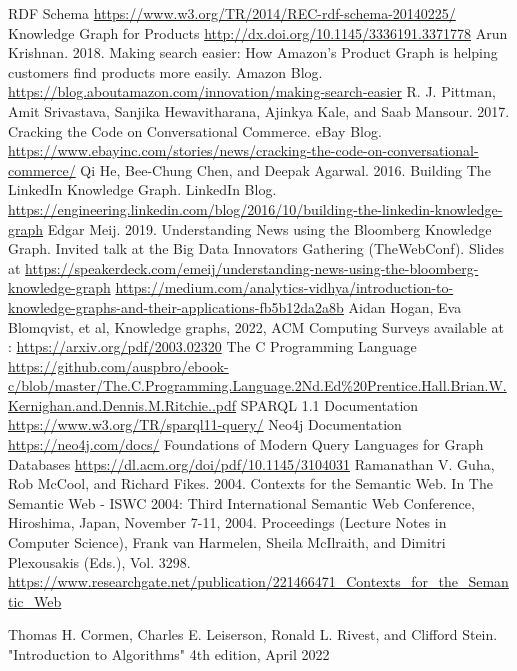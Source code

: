 \documentclass[conference]{IEEEtran}
\begin{document}
\begin{thebibliography}{00}
 RDF Schema \url{https://www.w3.org/TR/2014/REC-rdf-schema-20140225/}
 Knowledge Graph for Products \url{http://dx.doi.org/10.1145/3336191.3371778}
 Arun Krishnan. 2018. Making search easier: How Amazon’s Product Graph is helping customers find products more easily. Amazon Blog. \url{https://blog.aboutamazon.com/innovation/making-search-easier}
 R. J. Pittman, Amit Srivastava, Sanjika Hewavitharana, Ajinkya Kale, and Saab Mansour. 2017. Cracking the Code on Conversational Commerce. eBay Blog. \url{https://www.ebayinc.com/stories/news/cracking-the-code-on-conversational-commerce/}
 Qi He, Bee-Chung Chen, and Deepak Agarwal. 2016. Building The LinkedIn Knowledge Graph. LinkedIn Blog. \url{https://engineering.linkedin.com/blog/2016/10/building-the-linkedin-knowledge-graph}
 Edgar Meij. 2019. Understanding News using the Bloomberg Knowledge Graph. Invited talk at the Big Data Innovators Gathering (TheWebConf). Slides at \url{https://speakerdeck.com/emeij/understanding-news-using-the-bloomberg-knowledge-graph}
 \url{https://medium.com/analytics-vidhya/introduction-to-knowledge-graphs-and-their-applications-fb5b12da2a8b}
 Aidan Hogan, Eva Blomqvist, et al, Knowledge graphs, 2022, ACM Computing Surveys available at : \url{https://arxiv.org/pdf/2003.02320}
 The C Programming Language \url{https://github.com/auspbro/ebook-c/blob/master/The.C.Programming.Language.2Nd.Ed%20Prentice.Hall.Brian.W.Kernighan.and.Dennis.M.Ritchie..pdf}
 SPARQL 1.1 Documentation \url{https://www.w3.org/TR/sparql11-query/}
 Neo4j Documentation 
\url{https://neo4j.com/docs/}
 Foundations of Modern Query Languages for Graph
Databases \url{https://dl.acm.org/doi/pdf/10.1145/3104031}
 Ramanathan V. Guha, Rob McCool, and Richard Fikes. 2004. Contexts for the Semantic Web. In The Semantic Web -
ISWC 2004: Third International Semantic Web Conference, Hiroshima, Japan, November 7-11, 2004. Proceedings (Lecture
Notes in Computer Science), Frank van Harmelen, Sheila McIlraith, and Dimitri Plexousakis (Eds.), Vol. 3298. \url{https://www.researchgate.net/publication/221466471_Contexts_for_the_Semantic_Web}

 Thomas H. Cormen, Charles E. Leiserson, Ronald L. Rivest, and Clifford Stein. "Introduction to Algorithms" 4th edition, April 2022


\end{thebibliography}
\end{document}
